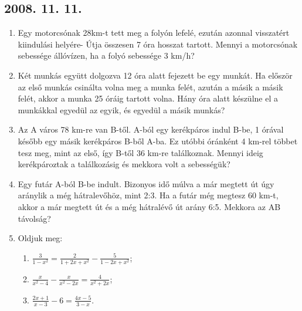 \documentclass{article}
\newenvironment{abc}{\begin{enumerate}[label=\textit{\alph*})]}{\end{enumerate}}
\begin{document}
\subsection*{2008. 11. 11.}
\begin{enumerate}
\item Egy motorcsónak 28km-t tett meg a folyón lefelé, ezután azonnal visszatért kiindulási helyére- Útja összesen 7 óra hosszat tartott. Mennyi a motorcsónak sebessége állóvízen, ha a folyó sebessége 3 km/h?
\item Két munkás együtt dolgozva 12 óra alatt fejezett be egy munkát. Ha először az első munkás csinálta volna meg a munka felét, azután a másik a másik felét, akkor a munka 25 óráig tartott volna. Hány óra alatt készülne el a munkákkal egyedül az egyik, és egyedül a másik munkás?
\item Az A város 78 km-re van B-től. A-ból egy kerékpáros indul B-be, 1 órával később egy másik kerékpáros B-ből A-ba. Ez utóbbi óránként 4 km-rel többet tesz meg, mint az első, így B-től 36 km-re találkoznak. Mennyi ideig kerékpároztak a találkozásig és mekkora volt a sebességük?
\item Egy futár A-ból B-be indult. Bizonyos idő múlva a már megtett út úgy aránylik a még hátralevőhöz, mint 2:3. Ha a futár még megtesz 60 km-t, akkor a már megtett út és a még hátralévő út arány 6:5. Mekkora az AB távolság?
\item Oldjuk meg:
\begin{abc}
\item $\displaystyle{\frac{3}{1-x^2}=\frac{2}{1+2x+x^2}-\frac{5}{1-2x+x^2}}$;
\item $\displaystyle{\frac{x}{x^2-4}-\frac{x}{x^2-2x}=\frac{4}{x^2+2x}}$;
\item $\displaystyle{\frac{2x+1}{x-3}-6=\frac{4x-5}{3-x}}$.
\end{abc}
\end{enumerate}
\end{document}

